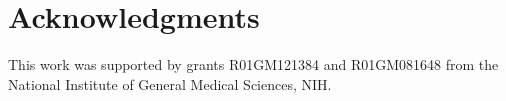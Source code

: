 \section*{Acknowledgments}

This work was supported by grants R01GM121384 and R01GM081648 from the National Institute of General Medical Sciences, NIH.